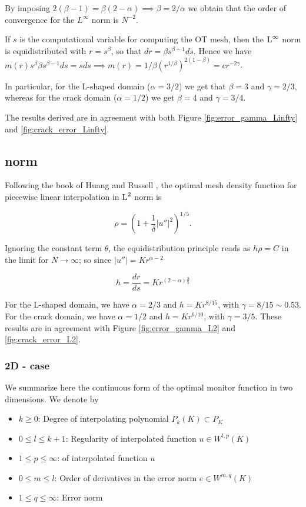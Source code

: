 \documentclass[a4paper,11pt]{article}
\begin{document}
{By imposing $2(\beta - 1) = \beta(2-\alpha) \implies \beta = 2/\alpha $ we obtain that the order of convergence for the $L^{\infty}$ norm is $N^{-2}$.

If $s$ is the computational variable for computing the OT mesh, then the $\operatorname L^{\infty}$ norm is equidistributed with $r = s^{\beta}$, so that $dr = \beta s^{\beta - 1} ds$. Hence we have $m(r) s^{\beta} \beta s^{\beta-1} ds = s ds \implies m(r) = 1/\beta (r^{1/\beta})^{2(1-\beta)} = c r^{-2\gamma}$.

In particular, for the L-shaped domain ($\alpha = 3/2$) we get that $\beta = 3$ and $\gamma = 2/3$, whereas for the crack domain ($\alpha = 1/2$) we get $\beta = 4$ and $\gamma = 3/4$.

The results derived are in agreement with both Figure \ref{fig:error_gamma_Linfty} and \ref{fig:crack_error_Linfty}.  

\subsection{ norm}

Following the book of Huang and Russell \cite{HR:2011}, the optimal mesh density function for piecewise linear interpolation in $\operatorname L^{2}$ norm is

$$\rho = \left(1 + \frac{1}{\delta}|u''|^{2} \right)^{1/5}.$$

Ignoring the constant term $\theta$, the equidistribution principle reads as $h\rho = C$ in the limit for $N \rightarrow \infty$; so since $|u''| = Kr^{\alpha - 2}$

$$h = \frac{dr}{ds} = K r^{(2 -\alpha)\frac{2}{5}}$$

For the L-shaped domain, we have $\alpha = 2/3$ and $h = K r^{8/15}$, with $\gamma = 8/15 \sim 0.53$. For the crack domain, we have $\alpha = 1/2$ and  $h = K r^{6/10}$, with $\gamma = 3/5$. These results are in agreement with Figure \ref{fig:error_gamma_L2} and \ref{fig:crack_error_L2}. 


\subsubsection{2D - case}

We summarize here the continuous form of the optimal monitor function in two dimensions. We denote by

\begin{itemize}
\item $k\geq 0$: Degree of interpolating polynomial  $P_{k}(K) \subset P_{K}$ 
\item $0 \leq l \leq k+1$: Regularity of interpolated function $u \in W^{l,p}(K)$
\item $1 \leq p \leq \infty$:  of interpolated function $u$
\item $0 \leq m \leq l$: Order of derivatives in the error norm $e \in W^{m,q}(K)$ 
\item $1 \leq q \leq \infty $: Error norm 
\end{itemize}

}
\end{document}

